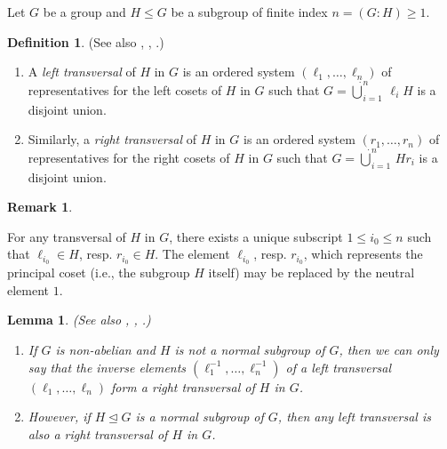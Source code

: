 \documentclass{amsart}
\newtheorem{lemma}{Lemma}[section]
\theoremstyle{definition}
\newtheorem{definition}{Definition}[section]
\newtheorem{remark}{Remark}[section]
\numberwithin{equation}{section}
\begin{document}
Let \(G\) be a group and \(H\le G\) be a subgroup of finite index \(n=(G:H)\ge 1\).


\begin{definition}
\label{dfn:Transversals}
(See also
\cite[p.1013]{Su},
\cite[(1.5.1), p.11]{Hl},
\cite[Satz 2.5, p.5]{Hp}.)

\begin{enumerate}

\item
A \textit{left transversal} of \(H\) in \(G\) is an ordered system \((\ell_1,\ldots,\ell_n)\)
of representatives for the left cosets of \(H\) in \(G\)
such that \(G=\dot{\bigcup}_{i=1}^n\,\ell_iH\) is a disjoint union.

\item
Similarly, a \textit{right transversal} of \(H\) in \(G\) is an ordered system \((r_1,\ldots,r_n)\)
of representatives for the right cosets of \(H\) in \(G\)
such that \(G=\dot{\bigcup}_{i=1}^n\,Hr_i\) is a disjoint union.

\end{enumerate}

\end{definition}


\begin{remark}
\label{rmk:Transversals}

For any transversal of \(H\) in \(G\),
there exists a unique subscript \(1\le i_0\le n\) such that \(\ell_{i_0}\in H\), resp. \(r_{i_0}\in H\).
The element \(\ell_{i_0}\), resp. \(r_{i_0}\),
which represents the principal coset (i.e., the subgroup \(H\) itself)
may be replaced by the neutral element \(1\).

\end{remark}


\begin{lemma}
\label{lem:Transversals}
(See also
\cite[p.1015]{Su},
\cite[(1.5.2), p.11]{Hl},
\cite[Satz 2.6, p.6]{Hp}.)

\begin{enumerate}

\item
If \(G\) is non-abelian and \(H\) is not a normal subgroup of \(G\),
then we can only say that the inverse elements \((\ell_1^{-1},\ldots,\ell_n^{-1})\)
of a left transversal \((\ell_1,\ldots,\ell_n)\)
form a right transversal of \(H\) in \(G\).

\item
However, if \(H\unlhd G\) is a normal subgroup of \(G\),
then any left transversal is also a right transversal of \(H\) in \(G\).

\end{enumerate}

\end{lemma}
\end{document}

